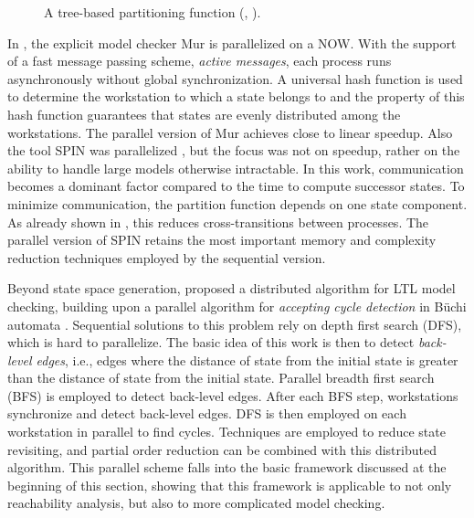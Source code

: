 \documentclass[copyright,creativecommons]{eptcs}
\newcommand{\CENTERPSSCALE}[2]{\begin{center}\mbox{\epsfig{file=#1.eps, scale=#2}}\end{center}}
\begin{document}
\begin{figure}
\begin{center}
\CENTERPSSCALE{treepartitioning}{0.65}
\end{center}
\caption{A tree-based partitioning function (, ).}
\label{FIG:treepartitioning}
\end{figure}

In \cite{Stern97murphi}, the explicit model checker Mur is
parallelized on a NOW. With the support of a fast message passing
scheme, \emph{active messages}, each process runs asynchronously
without global synchronization. A universal hash function is used to
determine the workstation to which a state belongs to and the
property of this hash function guarantees that states are
evenly distributed among the workstations.
The parallel version of Mur achieves close to linear speedup.
Also the tool SPIN was parallelized \cite{Lerda99}, but the focus was not on
speedup, rather on the ability to handle large models otherwise intractable.
In this work, communication becomes a dominant factor
compared to the time to compute successor states.
To minimize communication, the partition function  depends on one
state component.
As already shown in \cite{1998INFORMSJC-DistrGen},
this reduces cross-transitions between processes.
The parallel version of SPIN retains the most important memory and complexity
reduction techniques employed by the sequential version.

Beyond state space generation, \cite{BarnatBR05} proposed a
distributed algorithm for LTL model checking, building upon
a parallel algorithm for \emph{accepting cycle detection} in
B\"{u}chi automata \cite{BarnatASE03}.
Sequential solutions to this problem rely on depth first search (DFS),
which is hard to parallelize.
The basic idea of this work is then to detect \emph{back-level edges},
i.e., edges  where the distance of state  from the initial
state is greater than the distance of state  from the initial state.
Parallel breadth first search (BFS) is employed to
detect back-level edges.
After each BFS step, workstations synchronize and detect back-level edges.
DFS is then employed on each workstation in parallel to find cycles.
Techniques are employed to reduce state revisiting,
and partial order reduction can be combined with this distributed algorithm.
This parallel scheme falls into the basic framework
discussed at the beginning of this section, showing that
this framework is applicable to not only reachability analysis,
but also to more complicated model checking.
\end{document}
